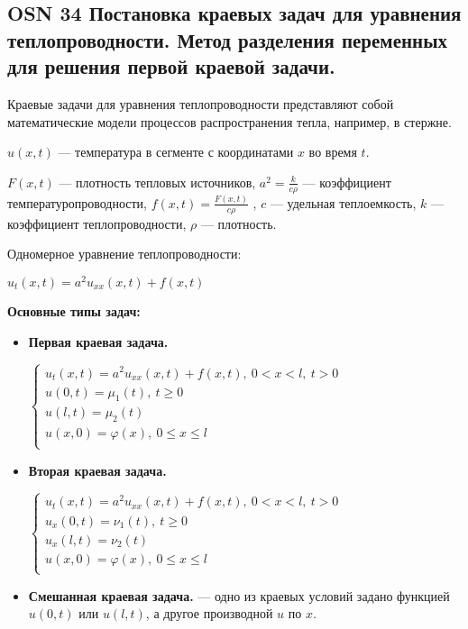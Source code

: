 \subsection{OSN 34 Постановка краевых задач для уравнения теплопроводности.  Метод разделения переменных для решения первой краевой задачи.}

Краевые задачи для уравнения теплопроводности представляют собой математические модели процессов распространения тепла, например, в стержне.
    
$u(x,t)$ --- температура в сегменте с координатами $x$ во время $t$.

$F(x, t)$ --- плотность тепловых источников, $a^2 = \frac{k}{c\rho}$ --- коэффициент температуропроводности, $f(x,t)=\frac{F(x,t)}{c\rho}$ , $c$ --- удельная теплоемкость, $k$ --- коэффициент теплопроводности, $\rho$ --- плотность.

\bigbreak

Одномерное уравнение теплопроводности:

$u_t(x,t)=a^2u_{xx}(x,t)+f(x,t)$


\textbf{Основные типы задач:}
\begin{itemize}
    \item \textbf{Первая краевая задача.}
    
    $\begin{cases}
    u_t(x,t)=a^2u_{xx}(x,t)+f(x,t),~0<x<l,~t>0&\\
    u(0,t)=\mu_1(t),~t\geqslant0&\\
    u(l,t)=\mu_2(t)&\\
    u(x,0)=\varphi(x),~0\leqslant x\leqslant l&\\
    \end{cases}$
    \item \textbf{Вторая краевая задача.}
    
    $\begin{cases}
    u_t(x,t)=a^2u_{xx}(x,t)+f(x,t),~0<x<l,~t>0&\\
    u_x(0,t)=\nu_1(t),~t\geqslant0&\\
    u_x(l,t)=\nu_2(t)&\\
    u(x,0)=\varphi(x),~0\leqslant x\leqslant l&\\
    \end{cases}$
    \item \textbf{Смешанная краевая задача.} --- одно из краевых условий задано функцией $u(0,t)$ или $u(l,t)$, а другое производной $u$ по $x$.
\end{itemize}

